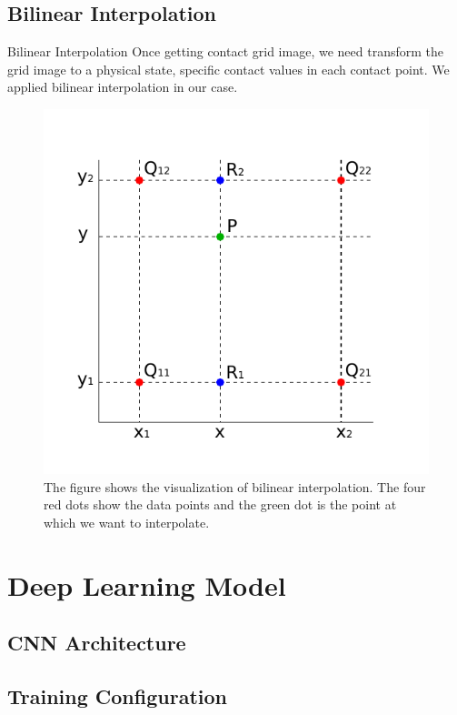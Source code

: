 \documentclass{beamer}
\begin{document}
\subsection{Bilinear Interpolation}
\begin{frame}{Bilinear Interpolation}
Once getting contact grid image, we need transform the grid image to a physical state, specific contact values in each contact point. We applied bilinear interpolation in our case.
\pause
\begin{figure}
        \centering
        \includegraphics[scale = 0.5]{../report/Figures/inp}
        \caption{The figure shows the visualization of bilinear interpolation. The four red dots show the data points and the green dot is the point at which we want to interpolate.}
\end{figure}
\end{frame}

\section{Deep Learning Model}
\subsection{CNN Architecture}
\subsection{Training Configuration}
\end{document}
